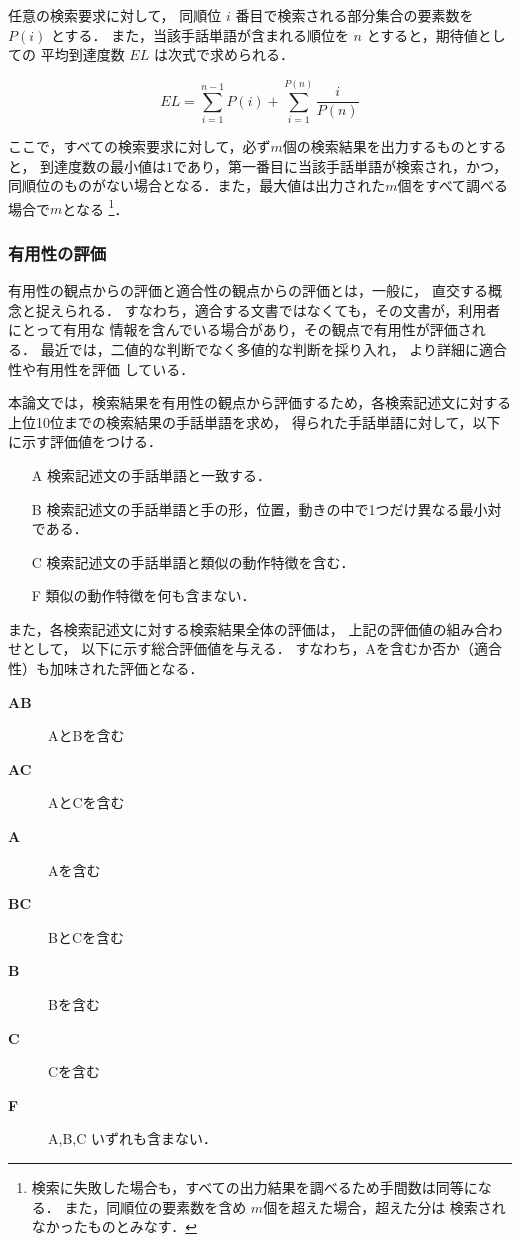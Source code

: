 任意の検索要求に対して，
同順位 $i$ 番目で検索される部分集合の要素数を
 $P(i)$ とする．
また，当該手話単語が含まれる順位を $n$ とすると，期待値としての
平均到達度数 $EL$ は次式で求められる．

\begin{equation}
EL = \sum_{i=1}^{n-1} P(i) + \sum_{i=1}^{P(n)} \frac{i}{P(n)}
\end{equation}

ここで，すべての検索要求に対して，必ず$m$個の検索結果を出力するものとすると，
到達度数の最小値は$1$であり，第一番目に当該手話単語が検索され，かつ，
同順位のものがない場合となる．また，最大値は出力された$m$個をすべて調べる
場合で$m$となる
\footnote{検索に失敗した場合も，すべての出力結果を調べるため手間数は同等になる．
また，同順位の要素数を含め $m$個を超えた場合，超えた分は
検索されなかったものとみなす．}．

\subsubsection {有用性の評価}

有用性の観点からの評価と適合性の観点からの評価とは，一般に，
直交する概念と捉えられる．
すなわち，適合する文書ではなくても，その文書が，利用者にとって有用な
情報を含んでいる場合があり，その観点で有用性が評価される．
最近では，二値的な判断でなく多値的な判断を採り入れ，
より詳細に適合性や有用性を評価
している\cite{SatoSatoshi1993,TanakaHideki1999}．

本論文では，検索結果を有用性の観点から評価するため，各検索記述文に対する
上位10位までの検索結果の手話単語を求め，
得られた手話単語に対して，以下に示す評価値をつける．

\begin{itemize}
\item [A] 検索記述文の手話単語と一致する．
\item [B] 検索記述文の手話単語と手の形，位置，動きの中で1つだけ異なる最小対である．
\item [C] 検索記述文の手話単語と類似の動作特徴を含む．
\item [F] 類似の動作特徴を何も含まない．
\end{itemize}

また，各検索記述文に対する検索結果全体の評価は，
上記の評価値の組み合わせとして，
以下に示す総合評価値を与える．
すなわち，Aを含むか否か（適合性）も加味された評価となる．

\begin{description}
\item [{\bf AB}] AとBを含む
\item [{\bf AC}] AとCを含む
\item [{\bf A\ \ }] Aを含む
\item [{\bf BC}] BとCを含む
\item [{\bf B\ \ }] Bを含む
\item [{\bf C\ \ }] Cを含む
\item [{\bf F\ \ }] A,B,C いずれも含まない．
\end{description}



